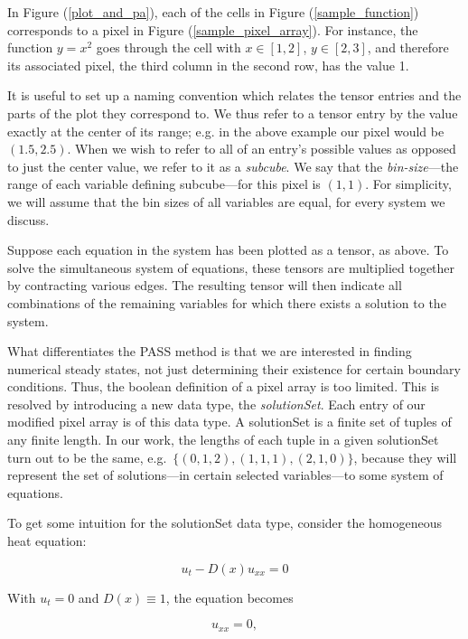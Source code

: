 \documentclass[11pt]{article}
\begin{document}
In Figure (\ref{plot_and_pa}), each of the cells in Figure (\ref{sample_function}) corresponds to a pixel in Figure (\ref{sample_pixel_array}). For instance, the function $y=x^2$ goes through the cell with $x \in [1,2]$, $y \in [2,3]$, and therefore its associated pixel, the third column in the second row, has the value 1.

It is useful to set up a naming convention which relates the tensor entries and the parts of the plot they correspond to. We thus refer to a tensor entry by the value exactly at the center of its range; e.g. in the above example our pixel would be $(1.5, 2.5)$. When we wish to refer to all of an entry's possible values as opposed to just the center value, we refer to it as a \textit{subcube}. We say that the \textit{bin-size}---the range of each variable defining subcube---for this pixel is $(1,1)$. For simplicity, we will assume that the bin sizes of all variables are equal, for every system we discuss. 

Suppose each equation in the system has been plotted as a tensor, as above. To solve the simultaneous system of equations, these tensors are multiplied together by contracting various edges. The resulting tensor will then indicate all combinations of the remaining variables for which there exists a solution to the system.

What differentiates the PASS method is that we are interested in finding numerical steady states, not just determining their existence for certain boundary conditions. Thus, the boolean definition of a pixel array is too limited. This is resolved by introducing a new data type, the \textit{solutionSet}. Each entry of our modified pixel array is of this data type. A solutionSet is a finite set of tuples of any finite length. In our work, the lengths of each tuple in a given solutionSet turn out to be the same, e.g.\  $\{(0,1,2), (1,1,1), (2,1,0)\}$, because they will represent the set of solutions---in certain selected variables---to some system of equations.

To get some intuition for the solutionSet data type, consider the homogeneous heat equation:

\begin{equation}
    \label{general homogeneous heat}
    u_t - D(x)u_{xx} = 0
\end{equation}

\noindent With $u_t = 0$ and $D(x) \equiv 1$, the equation becomes

\begin{equation}
    \label{homogeneous heat}
    u_{xx} = 0,
\end{equation}
\end{document}
